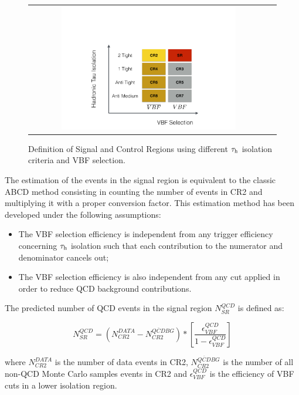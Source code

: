 \begin{figure}[tbh!]
	\centering
	\begin{tabular}{cc}
		\includegraphics[width=0.75\textwidth]{PLOTS/diTauHadLSotherPlots/controlregions.pdf}
	\end{tabular}
	\caption{Definition of Signal and Control Regions using different $\tau_{\text{h}}$ isolation criteria and VBF selection.}
	\label{fig:crs}
\end{figure}

The estimation of the events in the signal region is equivalent to the classic ABCD method consisting in counting the number of events in CR2 and multiplying it with a proper conversion factor. This estimation method has been developed under the following assumptions:

\begin{itemize}
	\item The VBF selection efficiency is independent from any trigger efficiency concerning $\tau_{\text{h}}$ isolation such that each contribution to the numerator and denominator cancels out;
	\item The VBF selection efficiency is also independent from any \met cut applied in order to reduce QCD background contributions. 
\end{itemize}

The predicted number of QCD events in the signal region $N^{QCD}_{SR}$ is defined as:

\begin{equation}
N^{QCD}_{SR} = \left( N^{DATA}_{CR2} - N^{\overline{QCD} BG}_{CR2} \right) * \left[ \frac{\epsilon^{QCD}_{VBF}}{1 - \epsilon^{QCD}_{VBF}} \right]
\label{eq:qcdbgpred}
\end{equation}

where $N^{DATA}_{CR2}$ is the number of data events in CR2, $N^{\overline{QCD} BG}_{CR2}$ is the number of all non-QCD Monte Carlo samples events in CR2 and $\epsilon^{QCD}_{VBF}$ is the efficiency of VBF cuts in a lower \hadtau isolation region. 

